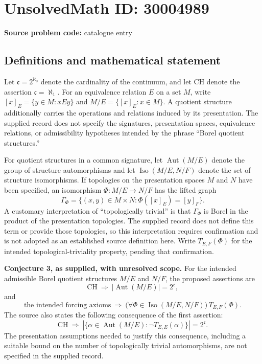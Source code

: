 \documentclass[11pt]{article}
\begin{document}
\section*{UnsolvedMath ID: 30004989}
\textbf{Source problem code:} catalogue entry
\subsection{Definitions and mathematical statement}
Let \(\mathfrak c=2^{\aleph_0}\) denote the cardinality of the continuum, and let \(\mathrm{CH}\) denote the assertion \(\mathfrak c=\aleph_1\). For an equivalence relation \(E\) on a set \(M\), write \([x]_E=\{y\in M:xEy\}\) and \(M/E=\{[x]_E:x\in M\}\). A quotient structure additionally carries the operations and relations induced by its presentation. The supplied record does not specify the signatures, presentation spaces, equivalence relations, or admissibility hypotheses intended by the phrase ``Borel quotient structures.''

For quotient structures in a common signature, let \(\operatorname{Aut}(M/E)\) denote the group of structure automorphisms and let \(\operatorname{Iso}(M/E,N/F)\) denote the set of structure isomorphisms. If topologies on the presentation spaces \(M\) and \(N\) have been specified, an isomorphism \(\Phi:M/E\to N/F\) has the lifted graph
\[
\Gamma_\Phi=\{(x,y)\in M\times N:\Phi([x]_E)=[y]_F\}.
\]
A customary interpretation of ``topologically trivial'' is that \(\Gamma_\Phi\) is Borel in the product of the presentation topologies. The supplied record does not define this term or provide those topologies, so this interpretation requires confirmation and is not adopted as an established source definition here. Write \(T_{E,F}(\Phi)\) for the intended topological-triviality property, pending that confirmation.

\textbf{Conjecture 3, as supplied, with unresolved scope.} For the intended admissible Borel quotient structures \(M/E\) and \(N/F\), the proposed assertions are
\[
\mathrm{CH}\ \Longrightarrow\ \bigl|\operatorname{Aut}(M/E)\bigr|=2^{\mathfrak c},
\]
and
\[
\text{the intended forcing axioms}\ \Longrightarrow\
\bigl(\forall\Phi\in\operatorname{Iso}(M/E,N/F)\bigr)\,T_{E,F}(\Phi).
\]
The source also states the following consequence of the first assertion:
\[
\mathrm{CH}\ \Longrightarrow\
\left|\{\alpha\in\operatorname{Aut}(M/E):\neg T_{E,E}(\alpha)\}\right|=2^{\mathfrak c}.
\]
The presentation assumptions needed to justify this consequence, including a suitable bound on the number of topologically trivial automorphisms, are not specified in the supplied record.
\end{document}
